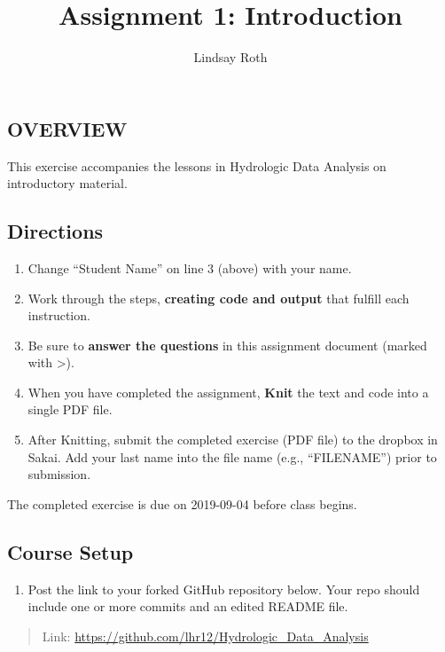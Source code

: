 \documentclass[]{article}
\title{Assignment 1: Introduction}
\author{Lindsay Roth}
\date{}
\providecommand{\tightlist}{%
  \setlength{\itemsep}{0pt}\setlength{\parskip}{0pt}}
\begin{document}
\maketitle

\hypertarget{overview}{%
\subsection{OVERVIEW}\label{overview}}

This exercise accompanies the lessons in Hydrologic Data Analysis on
introductory material.

\hypertarget{directions}{%
\subsection{Directions}\label{directions}}

\begin{enumerate}
\def\labelenumi{\arabic{enumi}.}
\tightlist
\item
  Change ``Student Name'' on line 3 (above) with your name.
\item
  Work through the steps, \textbf{creating code and output} that fulfill
  each instruction.
\item
  Be sure to \textbf{answer the questions} in this assignment document
  (marked with \textgreater{}).
\item
  When you have completed the assignment, \textbf{Knit} the text and
  code into a single PDF file.
\item
  After Knitting, submit the completed exercise (PDF file) to the
  dropbox in Sakai. Add your last name into the file name (e.g.,
  ``FILENAME'') prior to submission.
\end{enumerate}

The completed exercise is due on 2019-09-04 before class begins.

\hypertarget{course-setup}{%
\subsection{Course Setup}\label{course-setup}}

\begin{enumerate}
\def\labelenumi{\arabic{enumi}.}
\tightlist
\item
  Post the link to your forked GitHub repository below. Your repo should
  include one or more commits and an edited README file.
\end{enumerate}

\begin{quote}
Link: \url{https://github.com/lhr12/Hydrologic_Data_Analysis}
\end{quote}
\end{document}
